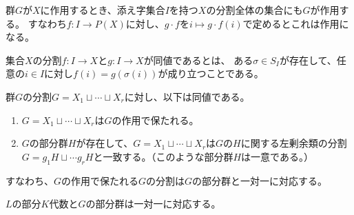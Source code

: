 \begin{proposition}
    \label{decomp-action}
    群$G$が$X$に作用するとき、添え字集合$I$を持つ$X$の分割全体の集合にも$G$が作用する。
    すなわち$f:I\to P(X)$に対し、$g\cdot f$を$i\mapsto g\cdot f(i)$で定めるとこれは作用になる。
\end{proposition}

\begin{proposition}
    \label{decomp-equiv, decomposition-def}
    集合$X$の分割$f:I\to X$と$g:I\to X$が同値であるとは、
    ある$\sigma\in S_I$が存在して、任意の$i\in I$に対し$f(i)=g(\sigma(i))$が成り立つことである。
\end{proposition}

\begin{proposition}\label{group-decomp}
    群$G$の分割$G=X_1\sqcup\cdots\sqcup X_r$に対し、以下は同値である。
    \begin{enumerate}
        \item $G=X_1\sqcup\cdots\sqcup X_r$は$G$の作用で保たれる。
        \item $G$の部分群$H$が存在して、$G=X_1\sqcup\cdots\sqcup X_r$は$G$の$H$に関する左剰余類の分割$G=g_1H\sqcup\cdots g_rH$と一致する。（このような部分群$H$は一意である。）
    \end{enumerate}
    すなわち、$G$の作用で保たれる$G$の分割は$G$の部分群と一対一に対応する。
\end{proposition}

\begin{theorem}\label{main}
    $L$の部分$K$代数と$G$の部分群は一対一に対応する。
\end{theorem}